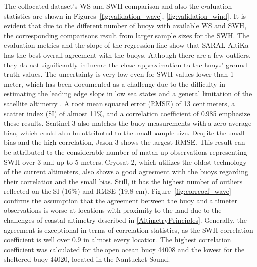 The collocated dataset's WS and SWH comparison and also the evaluation statistics are shown in Figures~\ref{fig:validation_wave}, \ref{fig:validation_wind}. It is evident that due to the different number of buoys with available WS and SWH, the corresponding comparisons result from larger sample sizes for the SWH. The evaluation metrics and the slope of the regression line show that SARAL-AltiKa has the best overall agreement with the buoys. Although there are a few outliers, they do not significantly influence the close approximation to the buoys' ground truth values. The uncertainty is very low even for SWH values lower than 1 meter, which has been documented as a challenge due to the difficulty in estimating the leading edge slope in low sea states and a general limitation of the satellite altimetry \cite{Ardhuin2019}. A root mean squared error (RMSE) of 13 centimeters, a scatter index (SI) of almost 11\%, and a correlation coefficient of 0.985 emphasize these results. Sentinel 3 also matches the buoy measurements with a zero average bias, which could also be attributed to the small sample size. Despite the small bias and the high correlation, Jason 3 shows the largest RMSE. This result can be attributed to the considerable number of match-up observations representing SWH over 3 and up to 5 meters. Cryosat 2, which utilizes the oldest technology of the current altimeters, also shows a good agreement with the buoys regarding their correlation and the small bias. Still, it has the highest number of outliers reflected on the SI (16\%) and RMSE (19.8 cm). Figure~\ref{fig:corrcoef_wave} confirms the assumption that the agreement between the buoy and altimeter observations is worse at locations with proximity to the land due to the challenges of coastal altimetry described in \ref{AltimetryPrinciples}. Generally, the agreement is exceptional in terms of correlation statistics, as the SWH correlation coefficient is well over 0.9 in almost every location. The highest correlation coefficient was calculated for the open ocean buoy 44008 and the lowest for the sheltered buoy 44020, located in the Nantucket Sound.

